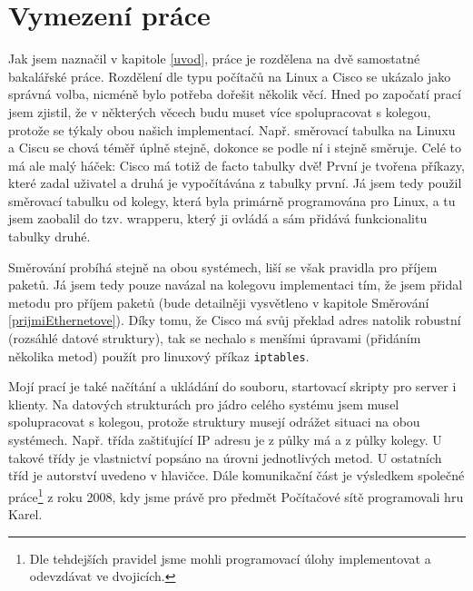 \section{Vymezení práce} \label{vymezeni}
Jak jsem naznačil v kapitole \ref{uvod}, práce je rozdělena na dvě samostatné bakalářské práce. Rozdělení dle typu počítačů na Linux a Cisco se ukázalo jako správná volba, nicméně bylo potřeba dořešit několik věcí. Hned po započatí prací jsem zjistil, že v některých věcech budu muset více spolupracovat s kolegou, protože se týkaly obou našich implementací. Např. směrovací tabulka na Linuxu a Ciscu se chová téměř úplně stejně, dokonce se podle ní i stejně směruje. Celé to má ale malý háček: Cisco má totiž de facto tabulky dvě! První je tvořena příkazy, které zadal uživatel a druhá je vypočítávána z tabulky první. Já jsem tedy použil směrovací tabulku od kolegy, která byla primárně programována pro Linux, a tu jsem zaobalil do tzv. wrapperu, který ji ovládá a sám přidává funkcionalitu tabulky druhé. 

Směrování probíhá stejně na obou systémech, liší se však pravidla pro příjem paketů. Já jsem tedy pouze navázal na kolegovu implementaci tím, že jsem přidal metodu pro příjem paketů (bude detailněji vysvětleno v kapitole Směrování \ref{prijmiEthernetove}). Díky tomu, že Cisco má svůj překlad adres natolik robustní (rozsáhlé datové struktury), tak se nechalo s menšími úpravami (přidáním několika metod) použít pro linuxový příkaz \verb|iptables|. 

Mojí prací je také načítání a ukládání do souboru, startovací skripty pro server i klienty. Na datových strukturách pro jádro celého systému jsem musel spolupracovat s kolegou, protože struktury musejí odrážet situaci na obou systémech. Např. třída zaštiťující IP adresu je z půlky má a z půlky kolegy. U takové třídy je vlastnictví popsáno na úrovni jednotlivých metod. U ostatních tříd je autorství uvedeno v hlavičce. Dále komunikační část je výsledkem společné práce\footnote{Dle tehdejších pravidel jsme mohli programovací úlohy implementovat a odevzdávat ve dvojicích.} z roku 2008, kdy jsme právě pro předmět Počítačové sítě programovali hru Karel.











